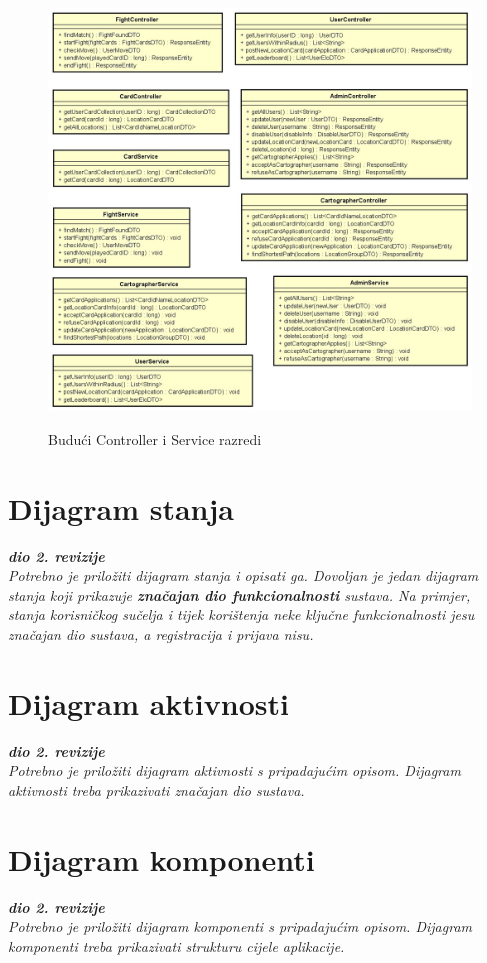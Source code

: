 			\begin{figure}[H]
				\centering
				\includegraphics[scale=0.75]{slike/buduciControllerService} \\
				\caption{ Budući Controller i Service razredi}
				\label{fig:dtoCiS}
			\end{figure}
			
			\eject
		
		\section{Dijagram stanja}
			
			
			\textbf{\textit{dio 2. revizije}}\\
			
			\textit{Potrebno je priložiti dijagram stanja i opisati ga. Dovoljan je jedan dijagram stanja koji prikazuje \textbf{značajan dio funkcionalnosti} sustava. Na primjer, stanja korisničkog sučelja i tijek korištenja neke ključne funkcionalnosti jesu značajan dio sustava, a registracija i prijava nisu. }
			
			
			\eject 
		
		\section{Dijagram aktivnosti}
			
			\textbf{\textit{dio 2. revizije}}\\
			
			 \textit{Potrebno je priložiti dijagram aktivnosti s pripadajućim opisom. Dijagram aktivnosti treba prikazivati značajan dio sustava.}
			
			\eject
		\section{Dijagram komponenti}
		
			\textbf{\textit{dio 2. revizije}}\\
		
			 \textit{Potrebno je priložiti dijagram komponenti s pripadajućim opisom. Dijagram komponenti treba prikazivati strukturu cijele aplikacije.}